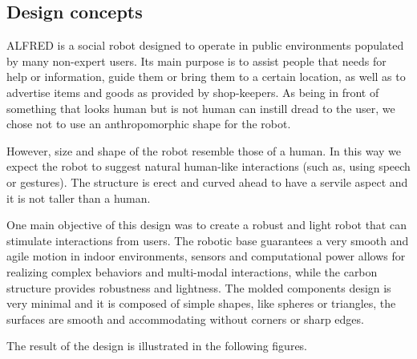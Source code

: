 \subsection{Design concepts}

ALFRED is a social robot designed to operate in public environments populated by many non-expert users.
Its main purpose is to assist people that needs for help or information, guide them or bring them to a certain
location, as well as to advertise items and goods as provided by shop-keepers.
As being in front of something that looks human but is not human can instill dread to the user, we chose not
to use an anthropomorphic shape for the robot.

However, size and shape of the robot resemble those of a human. In this way we expect the robot to suggest
natural human-like interactions (such as, using speech or gestures). The structure is erect and curved ahead to
have a servile aspect and it is not taller than a human.

One main objective of this design was to create a robust and light robot that can stimulate interactions from
users.
The robotic base guarantees a very smooth and agile motion in indoor environments, sensors and
computational power allows for realizing complex behaviors and multi-modal interactions, while the carbon
structure provides robustness and lightness.
The molded components design is very minimal and it is composed of simple shapes, like spheres or
triangles, the surfaces are smooth and accommodating without corners or sharp edges.

The result of the design is illustrated in the following figures.

